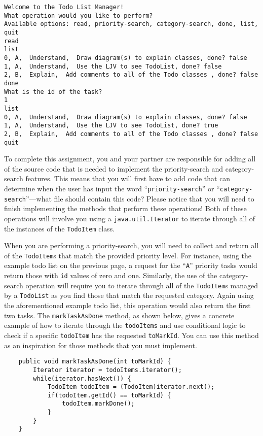\vspace{-0.05in}
\begin{verbatim}
Welcome to the Todo List Manager!
What operation would you like to perform?
Available options: read, priority-search, category-search, done, list, quit
read
list
0, A,  Understand,  Draw diagram(s) to explain classes, done? false
1, A,  Understand,  Use the LJV to see TodoList, done? false
2, B,  Explain,  Add comments to all of the Todo classes , done? false
done
What is the id of the task?
1
list
0, A,  Understand,  Draw diagram(s) to explain classes, done? false
1, A,  Understand,  Use the LJV to see TodoList, done? true
2, B,  Explain,  Add comments to all of the Todo classes , done? false
quit
\end{verbatim}
\vspace{-0.05in}

To complete this assignment, you and your partner are responsible for adding all of the source code that is needed to
implement the priority-search and category-search features. This means that you will first have to add code that can
determine when the user has input the word ``{\tt priority-search}'' or ``{\tt category-search}''---what file should
contain this code?  Please notice that you will need to finish implementing the methods that perform these operations!
Both of these operations will involve you using a {\tt java.util.Iterator} to iterate through all of the instances of
the {\tt TodoItem} class.

When you are performing a priority-search, you will need to collect and return all of the {\tt TodoItem}s that match the
provided priority level.  For instance, using the example todo list on the previous page, a request for the ``{\tt A}''
priority tasks would return those with {\tt id} values of zero and one. Similarly, the use of the category-search operation
will require you to iterate through all of the {\tt TodoItem}s managed by a {\tt TodoList} as you find those that match
the requested category. Again using the aforementioned example todo list, this operation would also return the first two tasks.
The {\tt markTaskAsDone} method, as shown below, gives a concrete example of how to iterate through the {\tt todoItems}
and use conditional logic to check if a specific {\tt todoItem} has the requested {\tt toMarkId}. You can use this
method as an inspiration for those methods that you must implement.

\vspace{-0.1in}
\begin{verbatim}
    public void markTaskAsDone(int toMarkId) {
        Iterator iterator = todoItems.iterator();
        while(iterator.hasNext()) {
            TodoItem todoItem = (TodoItem)iterator.next();
            if(todoItem.getId() == toMarkId) {
                todoItem.markDone();
            }
        }
    }
\end{verbatim}

